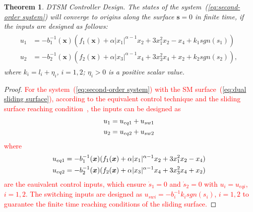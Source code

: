 \documentclass[3p]{elsarticle}
\theoremstyle{plain}
\newtheorem{mythm}{Theorem}
\theoremstyle{remark}
\begin{document}
\begin{mythm}\label{theorem:1}DTSM Controller Design. The states of the system~(\ref{eq:second-order system}) will converge to origins along the surface $\bm s=0$ in finite time, if the inputs are designed as follows:
\begin{align}
\begin{split}
u_1 &= -b_1^{-1}(\bm x)(f_1(\bm x)+\alpha\vert x_1\vert^{\alpha-1}x_2+3x_1^2x_2-x_4+k_1sgn(s_1))\\
u_2 &= -b_2^{-1}(\bm x)(f_2(\bm x)+\alpha\vert x_3\vert^{\alpha-1}x_4+3x_3^2x_4+x_2+k_2sgn(s_2)),\label{eq:DSM input}
\end{split}
\end{align}
where $k_i = l_i+\eta_i$, $i=1,2$; $\eta_i>0$ is a positive scalar value.
\end{mythm}
\begin{proof}
\textcolor{red}{For the system~(\ref{eq:second-order system}) with the SM surface~(\ref{eq:dual sliding surface}), according to the equivalent control technique and the sliding surface reaching condition~\cite{Arie1993sliding}, the inputs can be designed as
\begin{align}\begin{split}
u_1 &= u_{eq1}+u_{sw1}\\
u_2 &= u_{eq2}+u_{sw2}\notag
\end{split}\end{align}
where
\begin{align}\begin{split}
u_{eq1} &= -b_1^{-1}(\bm x)(f_1(\bm x)+\alpha\vert x_1\vert^{\alpha-1}x_2+3x_1^2x_2-x_4)\\
u_{eq2} &= -b_2^{-1}(\bm x)(f_2(\bm x)+\alpha\vert x_3\vert^{\alpha-1}x_4+3x_3^2x_4+x_2)\notag
\end{split}\end{align}
are the eauivalent control inputs, which ensure $\dot s_1 = 0$ and $\dot s_2=0$ with $u_i = u_{eqi}$, $i=1,2$. The switching inputs are designed as $u_{swi}=-b_i^{-1}k_isgn(s_i)$, $i=1,2$ to guarantee the finite time reaching conditions of the sliding surface.}


\end{proof}
\end{document}
